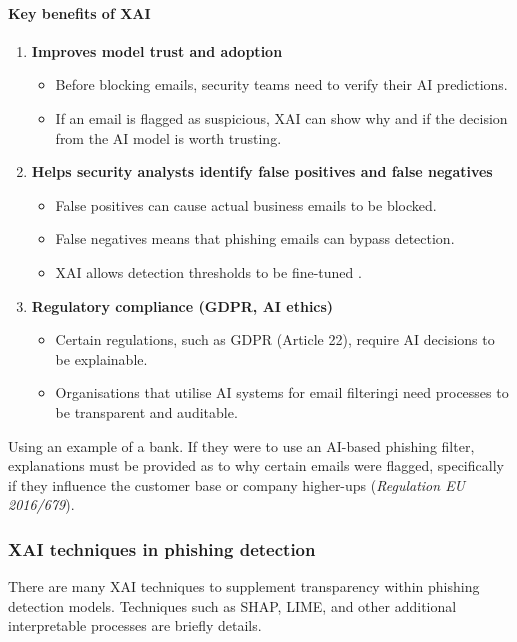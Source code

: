 \paragraph{Key benefits of XAI}
\begin{enumerate}
    \item \textbf{Improves model trust and adoption}
    \begin{itemize}
        \item Before blocking emails, security teams need to verify their AI predictions.
        \item If an email is flagged as suspicious, XAI can show why and if the decision from the AI model is worth trusting.
    \end{itemize}
    \item \textbf{Helps security analysts identify false positives and false negatives}
    \begin{itemize}
        \item False positives can cause actual business emails to be blocked.
        \item False negatives means that phishing emails can bypass detection.
        \item XAI allows detection thresholds to be fine-tuned \citep{ribeiro2016model}.
    \end{itemize}
    \item \textbf{Regulatory compliance (GDPR, AI ethics)}
    \begin{itemize}
        \item Certain regulations, such as GDPR (Article 22), require AI decisions to be explainable.
        \item Organisations that utilise AI systems for email filteringi need processes to be transparent and auditable.
    \end{itemize}
\end{enumerate}

\noindent Using an example of a bank. If they were to use an AI-based phishing filter, explanations must be provided as to why certain emails were flagged, specifically if they influence the customer base or company higher-ups (\textit{Regulation EU 2016/679}).

\subsubsection*{XAI techniques in phishing detection}
There are many XAI techniques to supplement transparency within phishing detection models. Techniques such as SHAP, LIME, and other additional interpretable processes are briefly details.

